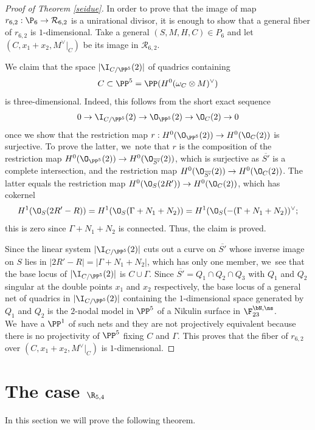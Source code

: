 \begin{proof}[Proof of Theorem \ref{seidue}]
In order to prove that the image of map $r_{6,2}:\P_{6}\to \mathcal R_{6,2}$ is a unirational divisor, it is enough to show that a general fiber of $r_{6,2}$ is $1$-dimensional. Take a general $(S,M,H,C)\in P_{6}$ and let $(C,x_1+x_2,M^\vee|_C)$ be its image in $\mathcal R_{6,2}$.

We claim that the space $|\I_{C/\PP^5}(2)|$ of quadrics containing\vspace*{-3pt}
\[
C\subset\PP^5=\PP(H^0(\omega_C\otimes M)^\vee)
\]
is three-dimensional. Indeed, this follows from the short exact sequence\vspace*{-3pt}
\[
0 \to \I_{C/\PP^5}(2) \to \O_{\PP^5}(2) \to \O_C(2) \to 0
\]
once we show that the restriction map $r:H^0( \O_{\PP^5}(2)) \to H^0(\O_C(2))$ is surjective.
To prove the latter, we~note that $r$ is the composition of the restriction map \linebreak $H^0( \O_{\PP^5}(2)) \to H^0(\O_{\overline{S'}}(2))$, which is surjective as $\overline{S'}$ is a complete intersection, and the restriction map $H^0(\O_{\overline{S'}}(2))\to H^0(\O_C(2))$. The latter equals the restriction map $H^0(\O_S(2R')) \to H^0(\O_C(2))$, which has cokernel\vspace*{-3pt}
\[
 H^1(\O_S(2R'-R))=H^1(\O_S(\Gamma+N_1+N_2))=H^1(\O_S(-(\Gamma+N_1+N_2))^{\vee};
\]
this is zero since $\Gamma+N_1+N_2$ is connected. Thus, the claim is proved.

Since the linear system $|\I_{C/\PP^5}(2)|$ cuts out a curve on $\overline{S'}$ whose inverse image on $S$ lies in $|2R'-R|=|\Gamma+N_1+N_2|$, which has only one member, we~see that the base locus of $|\I_{C/\PP^5}(2)|$ is $C\cup \Gamma$. Since $\overline{S'}=Q_1\cap Q_2\cap Q_3$ with $Q_1$ and $Q_2$ singular at the double points $x_1$ and $x_2$ respectively, the base locus of a general net of quadrics in $|\I_{C/\PP^5}(2)|$ containing the $1$-dimensional space generated by $Q_1$ and $Q_2$ is the $2$-nodal model in $\PP^5$ of a Nikulin surface in $\F_{23}^{\bN,\ns}$. We~have a $\PP^1$ of such nets and they are not projectively equivalent because there is no projectivity of $\PP^5$ fixing $C$ and $\Gamma$. This proves that the fiber of $r_{6,2}$ over $(C,x_1+x_2,M^\vee|_C)$ is $1$-dimensional.
\end{proof}

\section{The case \texorpdfstring{$\R_{5,4}$}{R}}
In this section we will prove the following theorem.

